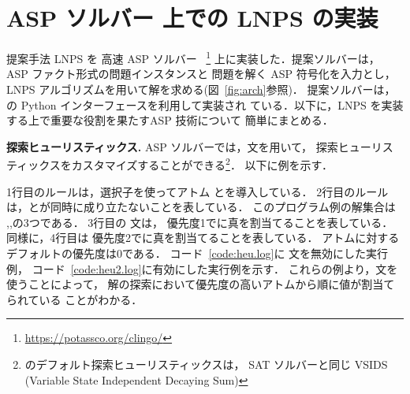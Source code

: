 \section{ASP ソルバー 上での LNPS の実装}
%
提案手法 LNPS を 高速 ASP ソルバー
{\clingo}~\footnote{\url{https://potassco.org/clingo/}}
上に実装した．提案ソルバーは，
ASP ファクト形式の問題インスタンスと
問題を解く ASP 符号化を入力とし，
LNPS アルゴリズムを用いて解を求める(図~\ref{fig:arch}参照)．
%
提案ソルバーは，{\clingo}の Python インターフェースを利用して実装され
ている．以下に，LNPS を実装する上で重要な役割を果たすASP 技術について
簡単にまとめる．

\textbf{探索ヒューリスティックス.}
ASP ソルバー{\clingo}では，文を用いて，
探索ヒューリスティックスをカスタマイズすることができる\footnote{%
{\clingo}のデフォルト探索ヒューリスティックスは，
SAT ソルバーと同じ VSIDS (Variable State Independent Decaying Sum)}．
以下に例を示す．





1行目のルールは，選択子を使ってアトム
とを導入している．
2行目のルールは，とが同時に成り立たないことを表している．
このプログラム例の解集合は
\code{\{\}},,の3つである．
3行目の 文は，
優先度1でに真を割当てることを表している．
同様に，4行目は
優先度2でに真を割当てることを表している．
アトムに対するデフォルトの優先度は0である．
%
コード~\ref{code:heu.log}に 文を無効にした実行例，
コード~\ref{code:heu2.log}に有効にした実行例を示す．
これらの例より，文を使うことによって，
解の探索において優先度の高いアトムから順に値が割当てられている
ことがわかる．

